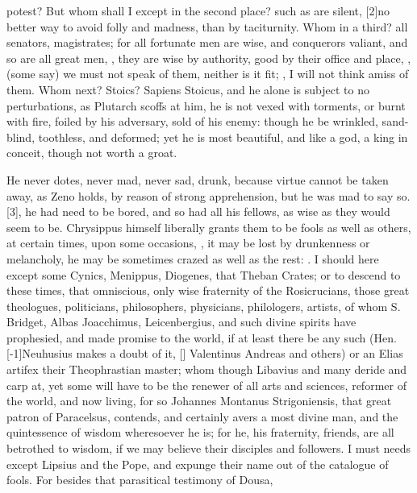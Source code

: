 {{potest?} But whom shall I except in the second place? such as are
silent,  [2\baselineskip]no better way to avoid folly
and madness, than by taciturnity. Whom in a third? all senators,
magistrates; for all fortunate men are wise, and conquerors valiant,
and so are all great men, , they are wise
by authority, good by their office and place, , (some say) we must not speak of them, neither is it fit; , I will not think amiss of them. Whom next?
Stoics? Sapiens Stoicus, and he alone is subject to no perturbations,
as Plutarch scoffs at him, he is not vexed with torments, or burnt
with fire, foiled by his adversary, sold of his enemy: though he be
wrinkled, sand-blind, toothless, and deformed; yet he is most
beautiful, and like a god, a king in conceit, though not worth a groat.

He never dotes, never mad, never sad, drunk, because virtue cannot be
taken away, as Zeno holds, by reason of strong apprehension, but
he was mad to say so. [3\baselineskip],
he had need to be bored, and so had all his fellows, as wise as they
would seem to be. Chrysippus himself liberally grants them to be fools
as well as others, at certain times, upon some occasions, , it may be lost by
drunkenness or melancholy, he may be sometimes crazed as well as the
rest: . I should here
except some Cynics, Menippus, Diogenes, that Theban Crates; or to
descend to these times, that omniscious, only wise fraternity of
the Rosicrucians, those great theologues, politicians, philosophers,
physicians, philologers, artists, \etc{} of whom S. Bridget, Albas
Joacchimus, Leicenbergius, and such divine spirits have prophesied, and
made promise to the world, if at least there be any such (Hen.
[-1\baselineskip]Neuhusius makes a doubt of it, [\baselineskip] Valentinus Andreas and
others) or an Elias artifex their Theophrastian master; whom though
Libavius and many deride and carp at, yet some will have to be the
renewer of all arts and sciences, reformer of the world, and now
living, for so Johannes Montanus Strigoniensis, that great patron of
Paracelsus, contends, and certainly avers a most divine man, and
the quintessence of wisdom wheresoever he is; for he, his fraternity,
friends, \etc{} are all betrothed to wisdom, if we may believe their
disciples and followers. I must needs except Lipsius and the Pope, and
expunge their name out of the catalogue of fools. For besides that
parasitical testimony of Dousa,

}

